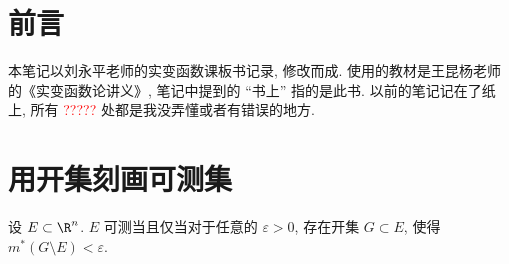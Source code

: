 \documentclass[UTF8, a4paper, 12pt, twoside, onecolumn]{book}
\newcommand{\watermark}[3]{\AddToShipoutPictureBG{
\parbox[b][\paperheight]{\paperwidth}{
\vfill%
\centering%
\tikz[remember picture, overlay]%
  \node [rotate = #1, scale = #2] at (current page.center)%
    {\textcolor{gray!80!cyan!30}{#3}};
\vfill}}}
\begin{document}

\thispagestyle{plain}

\renewcommand{\thepage}{C\arabic{page}}

\maketitle

\frontmatter	%
\chapter*{前言}

本笔记以刘永平老师的实变函数课板书记录, 修改而成. 使用的教材是王昆杨老师的《实变函数论讲义》, 笔记中提到的 “书上” 指的是此书. 以前的笔记记在了纸上, 所有 \textcolor{red}{?????} 处都是我没弄懂或者有错误的地方.

\tableofcontents

\mainmatter	%

\chapter{用开集刻画可测集}	%

\begin{Theorem}\label{thm:OpenMeas}
	设 $E \subset \R^n$. $E$ 可测当且仅当对于任意的 $\varepsilon > 0$, 存在开集 $G \subset E$, 使得 $m^*(G \setminus E) < \varepsilon$.
\end{Theorem}
\end{document}
